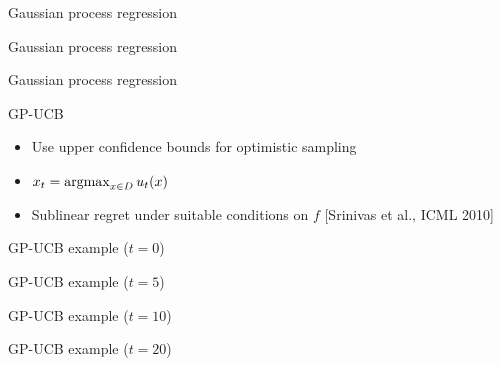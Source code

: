 \documentclass[xetex,10pt,mathserif,handout]{beamer}
\newlength\figureheight
\newlength\figurewidth
\begin{document}
\begin{frame}{Gaussian process regression}
\centering
\setlength\figurewidth{5in}
\setlength\figureheight{3.5in}

\end{frame}

\begin{frame}{Gaussian process regression}
\centering
\setlength\figurewidth{5in}
\setlength\figureheight{3.5in}

\end{frame}

\begin{frame}{Gaussian process regression}
\centering
\setlength\figurewidth{5in}
\setlength\figureheight{3.5in}

\end{frame}

\begin{frame}{GP-UCB}
\begin{itemize}
\item<1-> Use upper confidence bounds for optimistic sampling
\vspace{1em}
\item<2-> $x_t = \argmax_{x \in D}u_t(x)$\\[1em]
  \centering
  \setlength\figurewidth{4in}
  \setlength\figureheight{2.5in}
  
\vspace{0.5em}
\item<3-> Sublinear regret under suitable conditions on $f$ [Srinivas et al., ICML 2010]
\end{itemize}
\end{frame}

\begin{frame}{GP-UCB example ($t = 0$)}
\centering
\setlength\figurewidth{5in}
\setlength\figureheight{3.5in}

\end{frame}

\begin{frame}{GP-UCB example ($t = 5$)}
\centering
\setlength\figurewidth{5in}
\setlength\figureheight{3.5in}

\end{frame}

\begin{frame}{GP-UCB example ($t = 10$)}
\centering
\setlength\figurewidth{5in}
\setlength\figureheight{3.5in}

\end{frame}

\begin{frame}{GP-UCB example ($t = 20$)}
\centering
\setlength\figurewidth{5in}
\setlength\figureheight{3.5in}

\end{frame}
\end{document}
